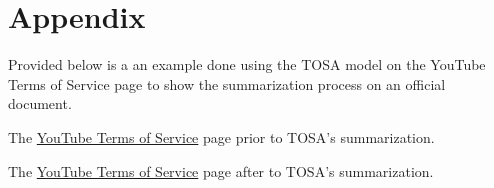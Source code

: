 \documentclass[sigconf, nonacm]{acmart}
\begin{document}




\section{Appendix}
Provided below is a an example done using the TOSA model on the YouTube Terms of Service page to show the summarization process on an official document.

The {\color{blue}\href{https://github.com/itsJohnny21/TOSA/blob/main/resources/simplified_tos/YouTube%20TOS.pdf}{YouTube Terms of Service}} page prior to TOSA's summarization.

The {\color{blue}\href{https://github.com/itsJohnny21/TOSA/blob/main/resources/simplified_tos/Simplified%20YouTube%20TOS.pdf}{YouTube Terms of Service}} page after to TOSA's summarization.
\end{document}
